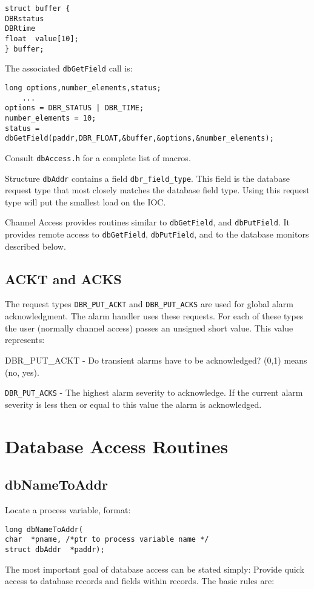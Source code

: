 \begin{verbatim}struct buffer {
DBRstatus
DBRtime
float  value[10];
} buffer;
\end{verbatim}The associated \verb|dbGetField| call is:

\begin{verbatim}long options,number_elements,status;
    ...
options = DBR_STATUS | DBR_TIME;
number_elements = 10;
status = dbGetField(paddr,DBR_FLOAT,&buffer,&options,&number_elements);
\end{verbatim}Consult \verb|dbAccess.h| for a complete list of macros.

Structure \verb|dbAddr| contains a field \verb|dbr_field_type|. This field is the database request type that most closely matches 
the database field type. Using this request type will put the smallest load on the IOC.

Channel Access provides routines similar to \verb|dbGetField|, and \verb|dbPutField|. It provides remote access to 
\verb|dbGetField|, \verb|dbPutField|, and to the database monitors described below.

\subsection{ACKT and ACKS}

The request types \verb|DBR_PUT_ACKT| and \verb|DBR_PUT_ACKS| are used for global alarm acknowledgment. The alarm handler 
uses these requests. For each of these types the user (normally channel access) passes an unsigned short value. This value 
represents:

DBR\_PUT\_ACKT - Do transient alarms have to be acknowledged? (0,1) means (no, yes).

\verb|DBR_PUT_ACKS| - The highest alarm severity to acknowledge. If the current alarm severity is less then or equal to this 
value the alarm is acknowledged.

\section{Database Access Routines}

\subsection{dbNameToAddr}

Locate a process variable, format:

\begin{verbatim}long dbNameToAddr(
char  *pname, /*ptr to process variable name */
struct dbAddr  *paddr);
\end{verbatim}The most important goal of database access can be stated simply: Provide quick access to database records and fields 
within records. The basic rules are:

